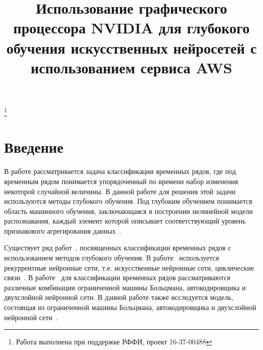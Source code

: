 \documentclass[12pt,twoside]{article}
\begin{document}
\title{Использование графического процессора NVIDIA для глубокого обучения искусственных нейросетей с использованием сервиса AWS}
\thanks{Работа выполнена при поддержке РФФИ, проект 16-37-00488}

\maketitle


\section{Введение}
В работе рассматривается задача классификации временных рядов, где
под временным рядом понимается упорядоченный по времени набор изменения некоторой случайной величины. В данной работе для решения этой задачи используются методы глубокого обучения. Под глубоким обучением понимается область машинного обучения, заключающаяся в построении нелинейной модели распознавания, каждый элемент которой описывает соответствующий уровень признакового агрегирования данных~\cite{foundamentals}.

Существует ряд работ~\cite{ts1,ts2,ts3}, посвященных классификации временных рядов с использованием методов глубокого обучения. В работе~\cite{ts2} используется рекуррентные нейронные сети, т.е. искусственные нейронные сети, циклические связи~\cite{foundamentals}. В работе~\cite{ts3} для классификации временных рядов рассматриваются различные комбинации ограниченной машины Больцмана, автокодировщика и двухслойной нейронной сети. В данной работе также исследуется модель, состоящая из ограниченной машины Больцмана, автокодировщика и двухслойной нейронной сети~\cite{foundamentals}.
\end{document}
